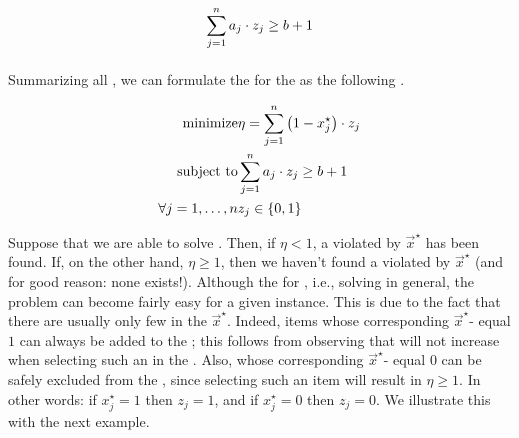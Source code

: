 \begin{equation}
\sumieqb[j]{1}{n}{a_j\cdot z_j}\geq b+1
\end{equation}

\paragraph{}
Summarizing all , we can formulate the  for the  as the following .

\begin{eqnarray}
\mbox{minimize}&\eta=\sumieqb[j]{1}{n}{\brak{1-x_j^{\star}}\cdot z_j}\eqnlab{sepco-m}\\
\mbox{subject to}&\sumieqb[j]{1}{n}{a_j\cdot z_j}\geq b+1\eqnlab{sepco-c1}\\
\forall\rangei[j]{1}{n}&z_j\in\accl{0,1}\eqnlab{sepco-c2}
\end{eqnarray}

Suppose that we are able to solve . Then, if $\eta<1$, a  violated by $\vec{x}^{\star}$ has been found. If, on the other hand, $\eta\geq1$, then we haven't found a  violated by $\vec{x}^{\star}$ (and for good reason: none exists!). Although the  for , i.e., solving   in general, the problem can become fairly easy for a given instance. This is due to the fact that there are usually only few  in the  $\vec{x}^{\star}$. Indeed, items whose corresponding $\vec{x}^{\star}$- equal $1$ can always be added to the ; this follows from observing that   will not increase when selecting such an  in the . Also,  whose corresponding $\vec{x}^{\star}$- equal $0$ can be safely excluded from the , since selecting such an item will result in $\eta\geq 1$. In other words: if $x_j^{\star}=1$ then $z_j=1$, and if $x_j^{\star}=0$ then $z_j=0$. We illustrate this with the next example.

